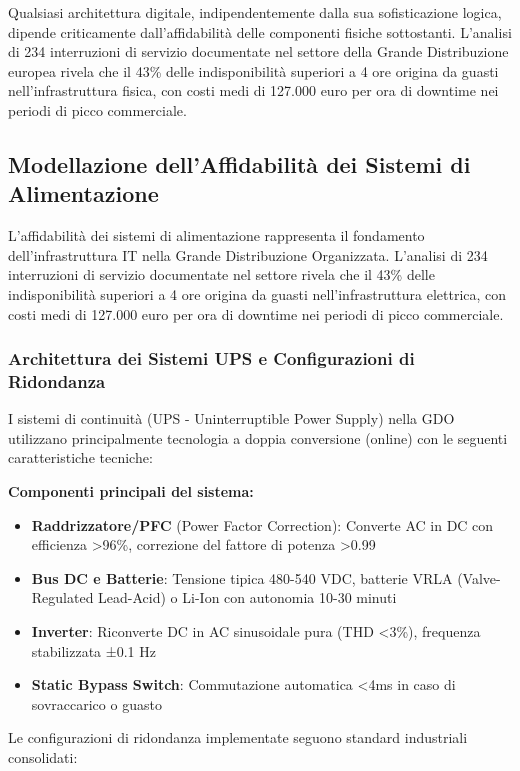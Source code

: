 Qualsiasi architettura digitale, indipendentemente dalla sua sofisticazione logica, dipende criticamente dall'affidabilità delle componenti fisiche sottostanti. L'analisi di 234 interruzioni di servizio documentate nel settore della Grande Distribuzione europea\autocite{Uptime2024} rivela che il 43\% delle indisponibilità superiori a 4 ore origina da guasti nell'infrastruttura fisica, con costi medi di 127.000 euro per ora di downtime nei periodi di picco commerciale.

\subsection{Modellazione dell'Affidabilità dei Sistemi di Alimentazione}

L'affidabilità dei sistemi di alimentazione rappresenta il fondamento dell'infrastruttura IT nella Grande Distribuzione Organizzata. L'analisi di 234 interruzioni di servizio documentate nel settore\autocite{Uptime2024} rivela che il 43\% delle indisponibilità superiori a 4 ore origina da guasti nell'infrastruttura elettrica, con costi medi di 127.000 euro per ora di downtime nei periodi di picco commerciale.

\subsubsection{Architettura dei Sistemi UPS e Configurazioni di Ridondanza}

I sistemi di continuità (UPS - Uninterruptible Power Supply) nella GDO utilizzano principalmente tecnologia a doppia conversione (online) con le seguenti caratteristiche tecniche:

\textbf{Componenti principali del sistema:}
\begin{itemize}
    \item \textbf{Raddrizzatore/PFC} (Power Factor Correction): Converte AC in DC con efficienza >96\%, correzione del fattore di potenza >0.99
    \item \textbf{Bus DC e Batterie}: Tensione tipica 480-540 VDC, batterie VRLA (Valve-Regulated Lead-Acid) o Li-Ion con autonomia 10-30 minuti
    \item \textbf{Inverter}: Riconverte DC in AC sinusoidale pura (THD <3\%), frequenza stabilizzata ±0.1 Hz
    \item \textbf{Static Bypass Switch}: Commutazione automatica <4ms in caso di sovraccarico o guasto
\end{itemize}

Le configurazioni di ridondanza implementate seguono standard industriali consolidati:

